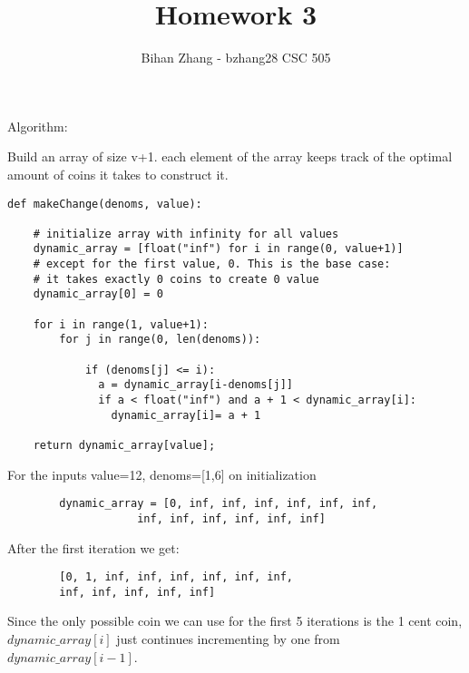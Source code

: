 \documentclass[12pt]{article}
\newenvironment{question}[2][Question]{\begin{trivlist}
		\item[\hskip \labelsep {\bfseries #1}\hskip \labelsep {\bfseries #2.}]}{\end{trivlist}}
\begin{document}
	
	
	
	\title{Homework 3}%
	\author{Bihan Zhang - bzhang28 %
		CSC 505} %
	
	\maketitle
	
	
	\begin{question}{1d} 

		Algorithm:
		
		Build an array of size v+1. each element of the array keeps track of the optimal amount of coins it takes to construct it.
\begin{lstlisting}
def makeChange(denoms, value):
	
	# initialize array with infinity for all values
	dynamic_array = [float("inf") for i in range(0, value+1)]
	# except for the first value, 0. This is the base case:
	# it takes exactly 0 coins to create 0 value
	dynamic_array[0] = 0
			
	for i in range(1, value+1):
		for j in range(0, len(denoms)):
	
			if (denoms[j] <= i):
			  a = dynamic_array[i-denoms[j]]
			  if a < float("inf") and a + 1 < dynamic_array[i]:
			    dynamic_array[i]= a + 1
			
	return dynamic_array[value]; 
\end{lstlisting}
		
		For the inputs value=12, denoms=[1,6] on initialization
		
		\begin{lstlisting}
		dynamic_array = [0, inf, inf, inf, inf, inf, inf, 
					inf, inf, inf, inf, inf, inf]
		\end{lstlisting}
		
		After the first iteration we get:
		\begin{lstlisting}
		[0, 1, inf, inf, inf, inf, inf, inf, 
		inf, inf, inf, inf, inf]		
		\end{lstlisting}
		Since the only possible coin we can use for the first 5 iterations is the 1 cent coin, $dynamic\_array[i]$ just continues incrementing by one from $dynamic\_array[i-1]$.
		

\end{question}
\end{document}
